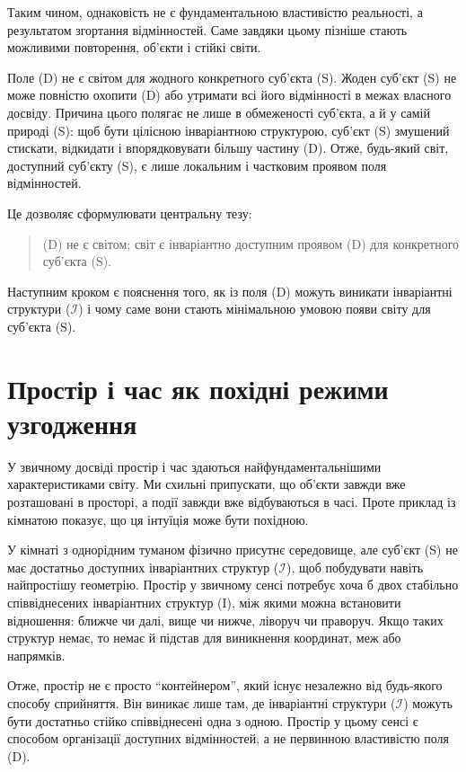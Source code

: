 \documentclass[aps,prd,onecolumn,nofootinbib,superscriptaddress]{revtex4-2} %
\begin{document}
    Таким чином, однаковість не є фундаментальною властивістю реальності, а результатом згортання відмінностей. Саме завдяки цьому пізніше стають можливими повторення, об’єкти і стійкі світи.

    Поле (D) не є світом для жодного конкретного суб’єкта (S). Жоден суб’єкт (S) не може повністю охопити (D) або утримати всі його відмінності в межах власного досвіду. Причина цього полягає не лише в обмеженості суб’єкта, а й у самій природі (S): щоб бути цілісною інваріантною структурою, суб’єкт (S) змушений стискати, відкидати і впорядковувати більшу частину (D). Отже, будь-який світ, доступний суб’єкту (S), є лише локальним і частковим проявом поля відмінностей.

    Це дозволяє сформулювати центральну тезу:
    \begin{quote}
        (D) не є світом; світ є інваріантно доступним проявом (D) для конкретного суб’єкта (S).
    \end{quote}

    Наступним кроком є пояснення того, як із поля (D) можуть виникати інваріантні структури ($\mathcal{I}$) і чому саме вони стають мінімальною умовою появи світу для суб’єкта (S).


    \section{Простір і час як похідні режими узгодження}
    У звичному досвіді простір і час здаються найфундаментальнішими характеристиками світу. Ми схильні припускати, що об’єкти завжди вже розташовані в просторі, а події завжди вже відбуваються в часі. Проте приклад із кімнатою показує, що ця інтуїція може бути похідною.

    У кімнаті з однорідним туманом фізично присутнє середовище, але суб’єкт (S) не має достатньо доступних інваріантних структур ($\mathcal{I}$), щоб побудувати навіть найпростішу геометрію. Простір у звичному сенсі потребує хоча б двох стабільно співвіднесених інваріантних структур (I), між якими можна встановити відношення: ближче чи далі, вище чи нижче, ліворуч чи праворуч. Якщо таких структур немає, то немає й підстав для виникнення координат, меж або напрямків.

    Отже, простір не є просто “контейнером”, який існує незалежно від будь-якого способу сприйняття. Він виникає лише там, де інваріантні структури ($\mathcal{I}$) можуть бути достатньо стійко співвіднесені одна з одною. Простір у цьому сенсі є способом організації доступних відмінностей, а не первинною властивістю поля (D).
\end{document}
